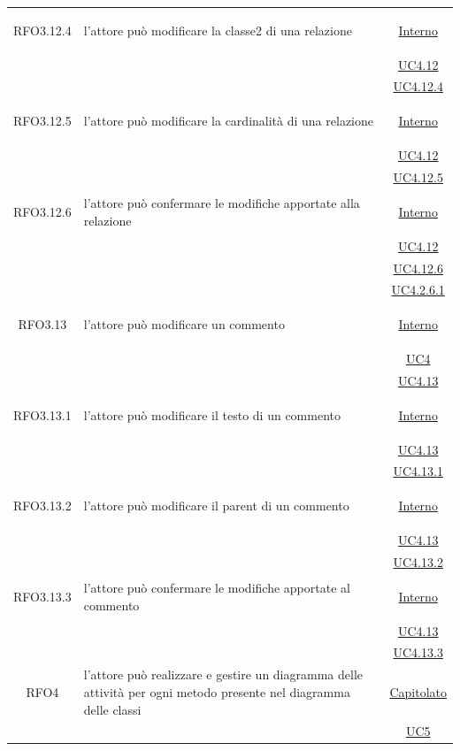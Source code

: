 \begin{longtable}{|c|>{\centering}m{7cm}|c|}
\hypertarget{RFO3.12.4}{RFO3.12.4} & l'attore può modificare la classe2 di una relazione &  \hyperlink{Interno}{Interno}\\
& &\hyperref[UC4.12]{UC4.12}\\
& &\hyperref[UC4.12.4]{UC4.12.4}\\ \hline

\hypertarget{RFO3.12.5}{RFO3.12.5} & l'attore può modificare la cardinalità di una relazione &  \hyperlink{Interno}{Interno}\\
& &\hyperref[UC4.12]{UC4.12}\\
& &\hyperref[UC4.12.5]{UC4.12.5}\\ \hline

\hypertarget{RFO3.12.6}{RFO3.12.6} & l'attore può confermare le modifiche apportate alla relazione &  \hyperlink{Interno}{Interno}\\
& &\hyperref[UC4.12]{UC4.12}\\
& &\hyperref[UC4.12.6]{UC4.12.6}\\ 
& &\hyperref[UC4.2.6.1]{UC4.2.6.1}\\ \hline

\hypertarget{RFO3.13}{RFO3.13} & l'attore può modificare un commento &  \hyperlink{Interno}{Interno}\\
& &\hyperref[UC4]{UC4}\\
& &\hyperref[UC4.13]{UC4.13}\\ \hline

\hypertarget{RFO3.13.1}{RFO3.13.1} & l'attore può modificare il testo di un commento &  \hyperlink{Interno}{Interno}\\
& &\hyperref[UC4.13]{UC4.13}\\
& &\hyperref[UC4.13.1]{UC4.13.1}\\ \hline

\hypertarget{RFO3.13.2}{RFO3.13.2} & l'attore può modificare il parent di un commento &  \hyperlink{Interno}{Interno}\\
& &\hyperref[UC4.13]{UC4.13}\\
& &\hyperref[UC4.13.2]{UC4.13.2}\\ \hline

\hypertarget{RFO3.13.3}{RFO3.13.3} & l'attore può confermare le modifiche apportate al commento &  \hyperlink{Interno}{Interno}\\
& &\hyperref[UC4.13]{UC4.13}\\
& &\hyperref[UC4.13.3]{UC4.13.3}\\ \hline

\hypertarget{RFO4}{RFO4} & l'attore può realizzare e gestire un diagramma delle attività per ogni metodo presente nel diagramma delle classi & \hyperlink{Capitolato}{Capitolato}\\
& & \hyperref[UC5]{UC5}\\ \hline


\end{longtable}
